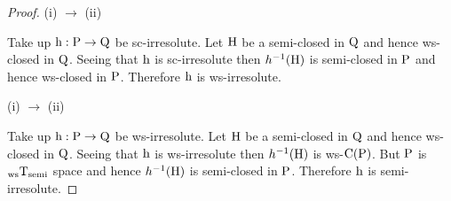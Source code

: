 \begin{proof}
(i) $\to$ (ii)

Take up $\mathrm{h}: \mathrm{P}\to \mathrm{Q}$ be sc-irresolute. Let $\mathrm{H}$ be a semi-closed in $\mathrm{Q}$ and hence ws-closed in $\mathrm{Q}$. Seeing that $\mathrm{h}$ is sc-irresolute then $h^{-1}(\mathrm{H})$ is semi-closed in $\mathrm{P}$ and hence ws-closed in $\mathrm{P}$. Therefore $\mathrm{h}$ is ws-irresolute.

(i) $\to$ (ii)

Take up $\mathrm{h}: \mathrm{P}\to \mathrm{Q}$ be ws-irresolute. Let $\mathrm{H}$ be a semi-closed in $\mathrm{Q}$ and hence ws-closed in $\mathrm{Q}$. Seeing that $\mathrm{h}$ is ws-irresolute then $h^{-1}(\mathrm{H})$ is ws-$\mathrm{C}(\mathrm{P})$. But $\mathrm{P}$ is $_{\mathrm{ws}}\mathrm{T}_{\text{semi}}$ space and hence $h^{-1}(\mathrm{H})$ is semi-closed in $\mathrm{P}$. Therefore $\mathrm{h}$ is semi-irresolute.
\end{proof}

